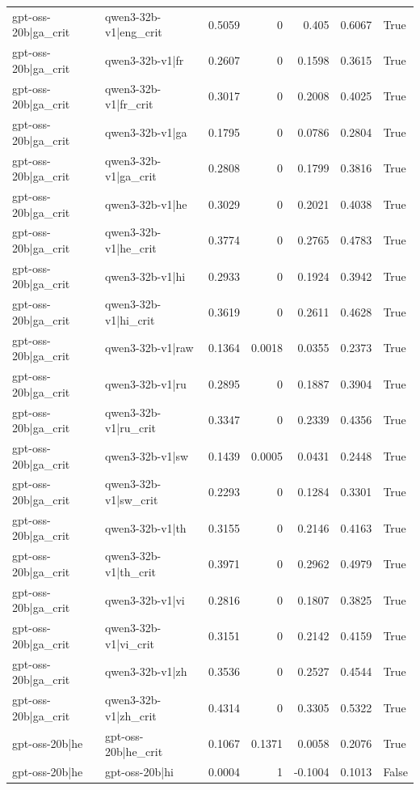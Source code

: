 \begin{table}
\begin{tabular}{l l r r r r l}
gpt-oss-20b|ga_crit & qwen3-32b-v1|eng_crit & 0.5059 & 0 & 0.405 & 0.6067 & True \\
gpt-oss-20b|ga_crit & qwen3-32b-v1|fr & 0.2607 & 0 & 0.1598 & 0.3615 & True \\
gpt-oss-20b|ga_crit & qwen3-32b-v1|fr_crit & 0.3017 & 0 & 0.2008 & 0.4025 & True \\
gpt-oss-20b|ga_crit & qwen3-32b-v1|ga & 0.1795 & 0 & 0.0786 & 0.2804 & True \\
gpt-oss-20b|ga_crit & qwen3-32b-v1|ga_crit & 0.2808 & 0 & 0.1799 & 0.3816 & True \\
gpt-oss-20b|ga_crit & qwen3-32b-v1|he & 0.3029 & 0 & 0.2021 & 0.4038 & True \\
gpt-oss-20b|ga_crit & qwen3-32b-v1|he_crit & 0.3774 & 0 & 0.2765 & 0.4783 & True \\
gpt-oss-20b|ga_crit & qwen3-32b-v1|hi & 0.2933 & 0 & 0.1924 & 0.3942 & True \\
gpt-oss-20b|ga_crit & qwen3-32b-v1|hi_crit & 0.3619 & 0 & 0.2611 & 0.4628 & True \\
gpt-oss-20b|ga_crit & qwen3-32b-v1|raw & 0.1364 & 0.0018 & 0.0355 & 0.2373 & True \\
gpt-oss-20b|ga_crit & qwen3-32b-v1|ru & 0.2895 & 0 & 0.1887 & 0.3904 & True \\
gpt-oss-20b|ga_crit & qwen3-32b-v1|ru_crit & 0.3347 & 0 & 0.2339 & 0.4356 & True \\
gpt-oss-20b|ga_crit & qwen3-32b-v1|sw & 0.1439 & 0.0005 & 0.0431 & 0.2448 & True \\
gpt-oss-20b|ga_crit & qwen3-32b-v1|sw_crit & 0.2293 & 0 & 0.1284 & 0.3301 & True \\
gpt-oss-20b|ga_crit & qwen3-32b-v1|th & 0.3155 & 0 & 0.2146 & 0.4163 & True \\
gpt-oss-20b|ga_crit & qwen3-32b-v1|th_crit & 0.3971 & 0 & 0.2962 & 0.4979 & True \\
gpt-oss-20b|ga_crit & qwen3-32b-v1|vi & 0.2816 & 0 & 0.1807 & 0.3825 & True \\
gpt-oss-20b|ga_crit & qwen3-32b-v1|vi_crit & 0.3151 & 0 & 0.2142 & 0.4159 & True \\
gpt-oss-20b|ga_crit & qwen3-32b-v1|zh & 0.3536 & 0 & 0.2527 & 0.4544 & True \\
gpt-oss-20b|ga_crit & qwen3-32b-v1|zh_crit & 0.4314 & 0 & 0.3305 & 0.5322 & True \\
gpt-oss-20b|he & gpt-oss-20b|he_crit & 0.1067 & 0.1371 & 0.0058 & 0.2076 & True \\
gpt-oss-20b|he & gpt-oss-20b|hi & 0.0004 & 1 & -0.1004 & 0.1013 & False \\

\end{tabular}
\end{table}
